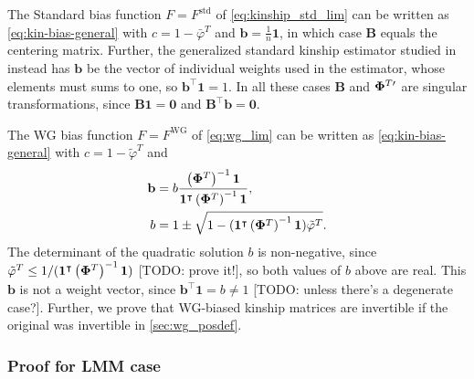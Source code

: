 \documentclass[11pt]{article}
\newcommand{\kinMat}[1][T]{%
  \ensuremath{%
    \mathbf{\Phi}^{#1}
  }%
  \xspace%
}%
\newcommand{\kinMatPrime}{%
  \ensuremath{%
    \mathbf{\Phi}^{T\prime}
  }%
  \xspace%
}%
\begin{document}
The Standard bias function $F = F^\text{std}$ of \cref{eq:kinship_std_lim} can be written as \cref{eq:kin-bias-general} with
$c = 1 - \bar{\varphi}^T$ and
$\mathbf{b} = \frac{1}{n} \mathbf{1}$, in which case $\mathbf{B}$ equals the centering matrix.
Further, the generalized standard kinship estimator studied in \citet{ochoa_estimating_2021} instead has $\mathbf{b}$ be the vector of individual weights used in the estimator, whose elements must sums to one, so $\mathbf{b}^\intercal \mathbf{1} = 1$.
In all these cases $\mathbf{B}$ and $\kinMatPrime$ are singular transformations, since $\mathbf{B} \mathbf{1} = \mathbf{0}$ and $\mathbf{B}^\intercal \mathbf{b} = \mathbf{0}$.

The WG bias function $F = F^\text{WG}$ of \cref{eq:wg_lim} can be written as \cref{eq:kin-bias-general} with
$c = 1 - \tilde{\varphi}^T$ and
\begin{align*}
  \mathbf{b}
  &=
    b \frac{ \left( \kinMat \right)^{-1} \mathbf{1} }{ \mathbf{1}^\intercal \left( \kinMat \right)^{-1} \mathbf{1} }
  , \\
  b
  &=
    1 \pm \sqrt{1 - (\mathbf{1}^\intercal \left( \kinMat \right)^{-1} \mathbf{1}) \tilde{\varphi}^T}
.
\end{align*}
The determinant of the quadratic solution $b$ is non-negative, since
$
\tilde{\varphi}^T \le 1 / (\mathbf{1}^\intercal \left( \kinMat \right)^{-1} \mathbf{1})
$
[TODO: prove it!], so both values of $b$ above are real.
This $\mathbf{b}$ is not a weight vector, since $\mathbf{b}^\intercal \mathbf{1} = b \ne 1$ [TODO: unless there's a degenerate case?].
Further, we prove that WG-biased kinship matrices are invertible if the original was invertible in \cref{sec:wg_posdef}.

\subsubsection{Proof for LMM case}
\end{document}
